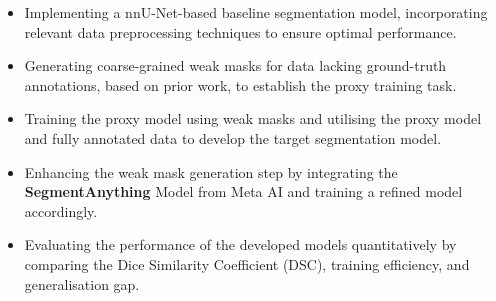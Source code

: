 \begin{itemize}
\item Implementing a nnU-Net-based baseline segmentation model, incorporating relevant data preprocessing techniques to ensure optimal performance.
\item Generating coarse-grained weak masks for data lacking ground-truth annotations, based on prior work, to establish the proxy training task.
\item Training the proxy model using weak masks and utilising the proxy model and fully annotated data to develop the target segmentation model.
\item Enhancing the weak mask generation step by integrating the \textbf{SegmentAnything} Model \cite{kirillov2023segany} from Meta AI and training a refined model accordingly.
\item Evaluating the performance of the developed models quantitatively by comparing the Dice Similarity Coefficient (DSC), training efficiency, and generalisation gap.
\end{itemize}